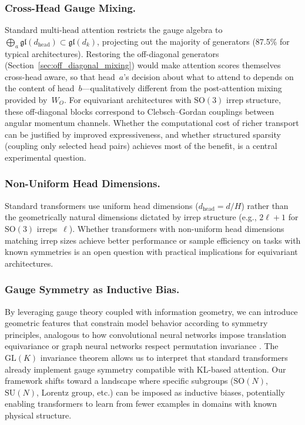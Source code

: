 \documentclass[twoside,11pt]{article}
\begin{document}
\subsubsection{Cross-Head Gauge Mixing.}

Standard multi-head attention restricts the gauge algebra to $\bigoplus_a \mathfrak{gl}(d_{\mathrm{head}}) \subset \mathfrak{gl}(d_k)$, projecting out the majority of generators (87.5\% for typical architectures). Restoring the off-diagonal generators (Section~\ref{sec:off_diagonal_mixing}) would make attention scores themselves cross-head aware, so that head~$a$'s decision about what to attend to depends on the content of head~$b$---qualitatively different from the post-attention mixing provided by~$W_O$. For equivariant architectures with $\mathrm{SO}(3)$ irrep structure, these off-diagonal blocks correspond to Clebsch--Gordan couplings between angular momentum channels. Whether the computational cost of richer transport can be justified by improved expressiveness, and whether structured sparsity (coupling only selected head pairs) achieves most of the benefit, is a central experimental question.

\subsubsection{Non-Uniform Head Dimensions.}

Standard transformers use uniform head dimensions ($d_{\mathrm{head}} = d/H$) rather than the geometrically natural dimensions dictated by irrep structure (e.g., $2\ell + 1$ for $\mathrm{SO}(3)$ irreps~$\ell$). Whether transformers with non-uniform head dimensions matching irrep sizes achieve better performance or sample efficiency on tasks with known symmetries is an open question with practical implications for equivariant architectures.

\subsubsection{Gauge Symmetry as Inductive Bias.}

By leveraging gauge theory coupled with information geometry, we can introduce geometric features that constrain model behavior according to symmetry principles, analogous to how convolutional neural networks impose translation equivariance or graph neural networks respect permutation invariance \citep{finzi2020generalizing,weiler20183d,kondor2018generalization}. The $\mathrm{GL}(K)$ invariance theorem allows us to interpret that standard transformers already implement gauge symmetry compatible with KL-based attention. Our framework shifts toward a landscape where specific subgroups ($\mathrm{SO}(N)$, $\mathrm{SU}(N)$, Lorentz group, etc.) can be imposed as inductive biases, potentially enabling transformers to learn from fewer examples in domains with known physical structure.
\end{document}
